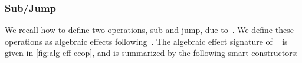 \subsubsection{Sub/Jump}
We recall how to define two operations, sub and jump, due to~\cite{thielecke1997phd,DBLP:conf/csl/FioreS14}.
We define these operations as algebraic effects following~\citet{SchrijversPWJ19}.
The algebraic effect signature of ~ is given in \cref{fig:alg-eff-ccop}, and is summarized by the following smart constructors:
%
\begin{code}[hide]%
%
\>[4]\AgdaSpace{}%
\AgdaSpace{}%
\AgdaSpace{}%
\AgdaSpace{}%
\AgdaSymbol{:}\AgdaSpace{}%
\AgdaSpace{}%
\AgdaSpace{}%
\AgdaSymbol{(}\AgdaSpace{}%
\AgdaSymbol{:}\AgdaSpace{}%
\AgdaSpace{}%
\AgdaSpace{}%
\AgdaSymbol{)}\AgdaSpace{}%
\AgdaSymbol{:}\AgdaSpace{}%
\AgdaSpace{}%
\<%
\\
\>[4][@{}l@{\AgdaIndent{0}}]%
\>[6]%
\>[12]\AgdaSymbol{:}\AgdaSpace{}%
\AgdaSymbol{\{}\AgdaSpace{}%
\AgdaSymbol{:}\AgdaSpace{}%
\AgdaSymbol{\}}%
\>[51]%
\>[54]\AgdaSpace{}%
\<%
\\
%
\>[6]%
\>[12]\AgdaSymbol{:}\AgdaSpace{}%
\AgdaSymbol{\{}\AgdaSpace{}%
\AgdaSymbol{:}\AgdaSpace{}%
\AgdaSymbol{\}}\AgdaSpace{}%
\AgdaSymbol{(}\AgdaSpace{}%
\AgdaSymbol{:}\AgdaSpace{}%
\AgdaSpace{}%
\AgdaSymbol{)}\AgdaSpace{}%
\AgdaSymbol{(}\AgdaSpace{}%
\AgdaSymbol{:}\AgdaSpace{}%
\AgdaSpace{}%
\AgdaSpace{}%
\AgdaSymbol{)}\AgdaSpace{}%
%
\>[55]\AgdaSpace{}%
\<%
\\
%
\\[\AgdaEmptyExtraSkip]%
%
\>[4]\AgdaSpace{}%
\AgdaSymbol{:}\AgdaSpace{}%
\AgdaSpace{}%
\AgdaSpace{}%
\AgdaSymbol{:}\AgdaSpace{}%
\AgdaSpace{}%
\AgdaSpace{}%
\AgdaSymbol{(}\AgdaSpace{}%
\AgdaSymbol{:}\AgdaSpace{}%
\AgdaSpace{}%
\AgdaSpace{}%
\AgdaSymbol{)}\AgdaSpace{}%
\AgdaSpace{}%
\<%
\\

\end{code}
